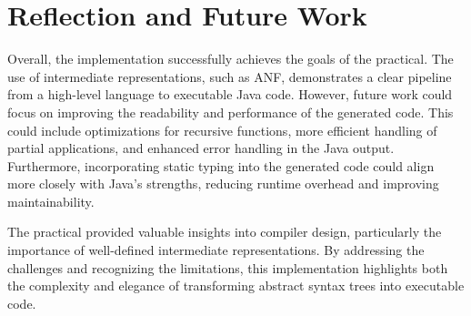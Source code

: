 \section{Reflection and Future Work}
Overall, the implementation successfully achieves the goals of the practical.
The use of intermediate representations, such as ANF, demonstrates a clear
pipeline from a high-level language to executable Java code. However, future
work could focus on improving the readability and performance of the generated
code. This could include optimizations for recursive functions, more efficient
handling of partial applications, and enhanced error handling in the Java
output. Furthermore, incorporating static typing into the generated code could
align more closely with Java's strengths, reducing runtime overhead and
improving maintainability.

The practical provided valuable insights into compiler design, particularly the
importance of well-defined intermediate representations. By addressing the
challenges and recognizing the limitations, this implementation highlights both
the complexity and elegance of transforming abstract syntax trees into
executable code.

